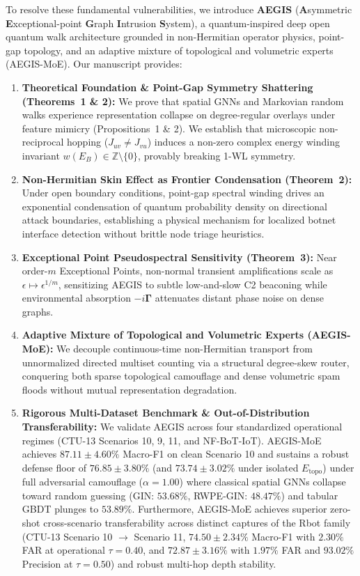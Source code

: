 \documentclass[10pt,a4paper]{article}
\begin{document}
To resolve these fundamental vulnerabilities, we introduce \textbf{AEGIS} (\textbf{A}symmetric \textbf{E}xceptional-point \textbf{G}raph \textbf{I}ntrusion \textbf{S}ystem), a quantum-inspired deep open quantum walk architecture grounded in non-Hermitian operator physics, point-gap topology, and an adaptive mixture of topological and volumetric experts (AEGIS-MoE). Our manuscript provides:
\begin{enumerate}
    \item \textbf{Theoretical Foundation \& Point-Gap Symmetry Shattering (Theorems~1 \& 2):} We prove that spatial GNNs and Markovian random walks experience representation collapse on degree-regular overlays under feature mimicry (Propositions~1 \& 2). We establish that microscopic non-reciprocal hopping ($J_{uv} \ne J_{vu}$) induces a non-zero complex energy winding invariant $w(E_B) \in \mathbb{Z} \setminus \{0\}$, provably breaking 1-WL symmetry.
    \item \textbf{Non-Hermitian Skin Effect as Frontier Condensation (Theorem~2):} Under open boundary conditions, point-gap spectral winding drives an exponential condensation of quantum probability density on directional attack boundaries, establishing a physical mechanism for localized botnet interface detection without brittle node triage heuristics.
    \item \textbf{Exceptional Point Pseudospectral Sensitivity (Theorem~3):} Near order-$m$ Exceptional Points, non-normal transient amplifications scale as $\epsilon \mapsto \epsilon^{1/m}$, sensitizing AEGIS to subtle low-and-slow C2 beaconing while environmental absorption $-i\boldsymbol{\Gamma}$ attenuates distant phase noise on dense graphs.
    \item \textbf{Adaptive Mixture of Topological and Volumetric Experts (AEGIS-MoE):} We decouple continuous-time non-Hermitian transport from unnormalized directed multiset counting via a structural degree-skew router, conquering both sparse topological camouflage and dense volumetric spam floods without mutual representation degradation.
    \item \textbf{Rigorous Multi-Dataset Benchmark \& Out-of-Distribution Transferability:} We validate AEGIS across four standardized operational regimes (CTU-13 Scenarios 10, 9, 11, and NF-BoT-IoT). AEGIS-MoE achieves $87.11 \pm 4.60\%$ Macro-F1 on clean Scenario 10 and sustains a robust defense floor of $76.85 \pm 3.80\%$ (and $73.74 \pm 3.02\%$ under isolated $E_{\text{topo}}$) under full adversarial camouflage ($\alpha = 1.00$) where classical spatial GNNs collapse toward random guessing (GIN: $53.68\%$, RWPE-GIN: $48.47\%$) and tabular GBDT plunges to $53.89\%$. Furthermore, AEGIS-MoE achieves superior zero-shot cross-scenario transferability across distinct captures of the Rbot family (CTU-13 Scenario 10 $\to$ Scenario 11, $74.50 \pm 2.34\%$ Macro-F1 with $2.30\%$ FAR at operational $\tau=0.40$, and $72.87 \pm 3.16\%$ with $1.97\%$ FAR and $93.02\%$ Precision at $\tau=0.50$) and robust multi-hop depth stability.

\end{enumerate}
\end{document}

